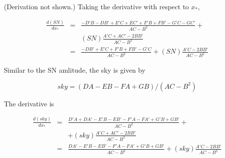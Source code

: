 \documentclass[12pt]{article}
\begin{document}
\noindent (Derivation not shown.) Taking the derivative with
respect to $x_\ast$,

\begin{eqnarray*}
\frac{d(SN)}{dx_\ast} &=& \frac{-D'B - DB' + E'C + EC' + F'B + FB' - G'C - GC'}{AC - B^2} + \\
                     & & (SN) \frac{A'C + AC' - 2BB'}{AC-B^2} \\
                     &=& \frac{-DB' + E'C + F'B + FB' - G'C}{AC - B^2} + (SN) \frac{A'C - 2BB'}{AC-B^2}
\end{eqnarray*}

Similar to the SN amlitude, the sky is given by

\begin{equation}
sky = (DA - EB - FA + GB) / (AC - B^2)
\end{equation}

\noindent The derivative is

\begin{eqnarray*}
\frac{d(sky)}{dx_\ast} &=& \frac{D'A + DA' - E'B - EB' - F'A - FA' + G'B + GB'}{AC - B^2} + \\
                   & &  + (sky) \frac{A'C + AC' - 2BB'}{AC-B^2} \\
                   &=& \frac{DA' - E'B - EB' - F'A - FA' + G'B + GB'}{AC - B^2} + (sky) \frac{A'C - 2BB'}{AC-B^2}
\end{eqnarray*}
\end{document}
